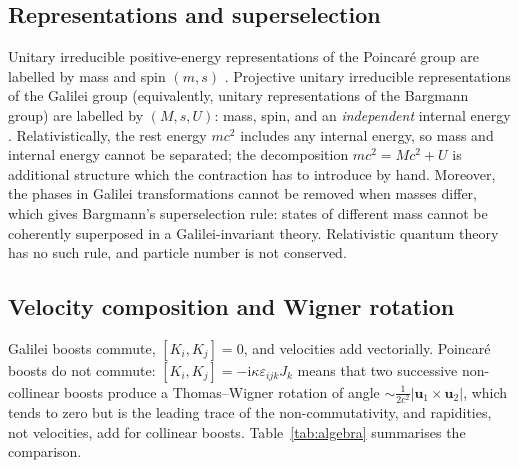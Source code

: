 \documentclass[11pt,a4paper]{article}
\newcommand{\ii}{\mathrm{i}}
\newcommand{\eps}{\varepsilon}
\newcommand{\bu}{\mathbf{u}}
\theoremstyle{plain}
\theoremstyle{definition}
\theoremstyle{remark}
\begin{document}
\subsection{Representations and superselection}
Unitary irreducible positive-energy representations of the Poincar\'e group are labelled by mass
and spin $(m,s)$ \cite{Wigner39}. Projective unitary irreducible representations of the Galilei group
(equivalently, unitary representations of the Bargmann group) are labelled by $(M,s,U)$:
mass, spin, and an \emph{independent} internal energy \cite{Bargmann54,LL63}. Relativistically, the
rest energy $mc^2$ includes any internal energy, so mass and internal energy cannot be separated; the
decomposition $mc^2=Mc^2+U$ is additional structure which the contraction has to introduce by hand.
Moreover, the phases in Galilei transformations cannot be removed when masses differ, which gives
Bargmann's superselection rule: states of different mass cannot be coherently superposed in a
Galilei-invariant theory. Relativistic quantum theory has no such rule, and particle number is not
conserved.

\subsection{Velocity composition and Wigner rotation}
Galilei boosts commute, $[K_i,K_j]=0$, and velocities add vectorially. Poincar\'e boosts do not
commute: $[K_i,K_j]=-\ii\kappa\eps_{ijk}J_k$ means that two successive non-collinear boosts produce
a Thomas--Wigner rotation of angle $\sim \frac{1}{2c^2}|\bu_1\times\bu_2|$, which tends to zero but is
the leading trace of the non-commutativity, and rapidities, not velocities, add for collinear
boosts. Table~\ref{tab:algebra} summarises the comparison.
\end{document}
